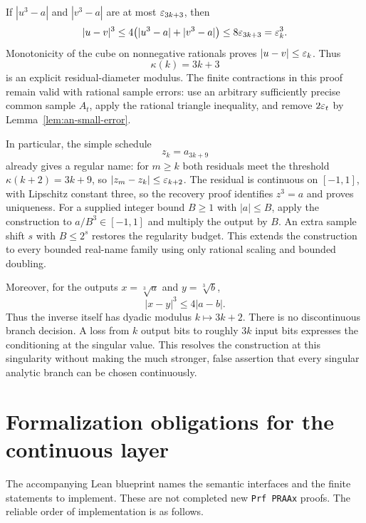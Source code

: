 If $|u^3-a|$ and $|v^3-a|$ are at most
$\varepsilon_{3k+3}$, then
\[
 |u-v|^3\le4\bigl(|u^3-a|+|v^3-a|\bigr)
 \le8\varepsilon_{3k+3}=\varepsilon_k^3.
\]
Monotonicity of the cube on nonnegative rationals proves
$|u-v|\le\varepsilon_k$.  Thus
\begin{equation}
 \kappa(k)=3k+3
 \label{eq:an-cubic-kappa}
\end{equation}
is an explicit residual-diameter modulus.  The finite contractions in
this proof remain valid with rational sample errors: use an arbitrary
sufficiently precise common sample $A_t$, apply the rational triangle
inequality, and remove $2\varepsilon_t$ by
Lemma~\ref{lem:an-small-error}.

In particular, the simple schedule
\[
 z_k=a_{3k+9}
\]
already gives a regular name: for $m\ge k$ both residuals meet the
threshold $\kappa(k+2)=3k+9$, so
$|z_m-z_k|\le\varepsilon_{k+2}$.
The residual is continuous on $[-1,1]$, with Lipschitz constant three,
so the recovery proof identifies $z^3=a$ and proves uniqueness.
For a supplied integer bound $B\ge1$ with $|a|\le B$, apply the
construction to $a/B^3\in[-1,1]$ and multiply the output by $B$.
An extra sample shift $s$ with $B\le2^s$ restores the regularity
budget.  This extends the construction to every bounded real-name
family using only rational scaling and bounded doubling.

Moreover, for the outputs $x=\sqrt[3]{a}$ and $y=\sqrt[3]{b}$,
\[
 |x-y|^3\le4|a-b|.
\]
Thus the inverse itself has dyadic modulus $k\mapsto3k+2$.
There is no discontinuous branch decision.  A loss from $k$ output
bits to roughly $3k$ input bits expresses the conditioning at the
singular value.  This resolves the construction at this singularity
without making the much stronger, false assertion that every
singular analytic branch can be chosen continuously.

\section{Formalization obligations for the continuous layer}
\label{sec:analytic-lean-obligations}

The accompanying Lean blueprint names the semantic interfaces and the
finite statements to implement.  These are not completed new
\texttt{Prf PRAAx} proofs.  The reliable order of implementation is
as follows.

